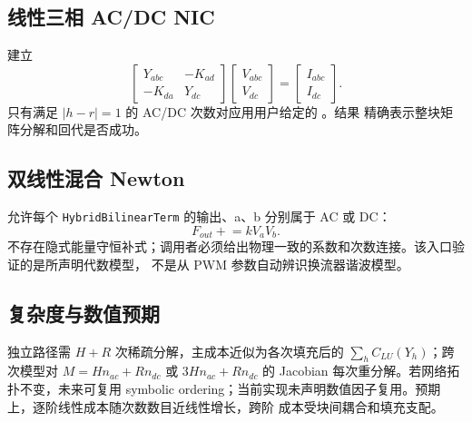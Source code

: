 \subsection{线性三相 AC/DC NIC}
 建立
\begin{equation}
\begin{bmatrix}Y_{abc}&-K_{ad}\\-K_{da}&Y_{dc}\end{bmatrix}
\begin{bmatrix}V_{abc}\\V_{dc}\end{bmatrix}=
\begin{bmatrix}I_{abc}\\I_{dc}\end{bmatrix}.
\end{equation}
只有满足 $|h-r|=1$ 的 AC/DC 次数对应用用户给定的 。结果
 精确表示整块矩阵分解和回代是否成功。

\subsection{双线性混合 Newton}
 允许每个
\texttt{HybridBilinearTerm} 的输出、a、b 分别属于 AC 或 DC：
\begin{equation}
F_{out}\mathrel{+}=kV_aV_b.
\end{equation}
不存在隐式能量守恒补式；调用者必须给出物理一致的系数和次数连接。该入口验证的是所声明代数模型，
不是从 PWM 参数自动辨识换流器谐波模型。

\subsection{复杂度与数值预期}
独立路径需 $H+R$ 次稀疏分解，主成本近似为各次填充后的 $\sum_h C_{LU}(Y_h)$；跨次模型对
$M=Hn_{ac}+Rn_{dc}$ 或 $3Hn_{ac}+Rn_{dc}$ 的 Jacobian 每次重分解。若网络拓扑不变，未来可复用
symbolic ordering；当前实现未声明数值因子复用。预期上，逐阶线性成本随次数数目近线性增长，跨阶
成本受块间耦合和填充支配。
